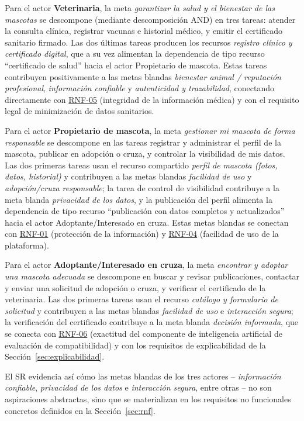 \documentclass[journal,onecolumn]{IEEEtran}
\begin{document}
	Para el actor \textbf{Veterinaria}, la meta \emph{garantizar la salud y el
		bienestar de las mascotas} se descompone (mediante descomposición AND) en tres
	tareas: atender la consulta clínica, registrar vacunas e historial médico, y
	emitir el certificado sanitario firmado. Las dos últimas tareas producen los
	recursos \emph{registro clínico y certificado digital}, que a su vez alimentan
	la dependencia de tipo recurso \enquote{certificado de salud} hacia el actor
	Propietario de mascota. Estas tareas contribuyen positivamente a las metas
	blandas \emph{bienestar animal / reputación profesional},
	\emph{información confiable} y \emph{autenticidad y trazabilidad}, conectando
	directamente con \hyperref[tab:RNF-05]{RNF-05} (integridad de la información médica) y con el
	requisito legal de minimización de datos sanitarios.
	
	Para el actor \textbf{Propietario de mascota}, la meta \emph{gestionar mi
		mascota de forma responsable} se descompone en las tareas registrar y
	administrar el perfil de la mascota, publicar en adopción o cruza, y
	controlar la visibilidad de mis datos. Las dos primeras tareas usan el
	recurso compartido \emph{perfil de mascota (fotos, datos, historial)} y
	contribuyen a las metas blandas \emph{facilidad de uso} y
	\emph{adopción/cruza responsable}; la tarea de control de visibilidad
	contribuye a la meta blanda \emph{privacidad de los datos}, y la publicación
	del perfil alimenta la dependencia de tipo recurso \enquote{publicación con
		datos completos y actualizados} hacia el actor Adoptante/Interesado en cruza.
	Estas metas blandas se conectan con \hyperref[tab:RNF-01]{RNF-01} (protección de la información) y
	\hyperref[tab:RNF-04]{RNF-04} (facilidad de uso de la plataforma).
	
	Para el actor \textbf{Adoptante/Interesado en cruza}, la meta \emph{encontrar
		y adoptar una mascota adecuada} se descompone en buscar y revisar
	publicaciones, contactar y enviar una solicitud de adopción o cruza, y
	verificar el certificado de la veterinaria. Las dos primeras tareas usan el
	recurso \emph{catálogo y formulario de solicitud} y contribuyen a las metas
	blandas \emph{facilidad de uso} e \emph{interacción segura}; la verificación
	del certificado contribuye a la meta blanda \emph{decisión informada}, que se
	conecta con \hyperref[tab:RNF-06]{RNF-06} (exactitud del componente de inteligencia artificial de
	evaluación de compatibilidad) y con los requisitos de explicabilidad de la
	Sección~\ref{sec:explicabilidad}.
	
	El SR evidencia así cómo las metas blandas de los tres actores --
	\emph{información confiable}, \emph{privacidad de los datos} e
	\emph{interacción segura}, entre otras -- no son aspiraciones abstractas, sino
	que se materializan en los requisitos no funcionales concretos definidos en la
	Sección~\ref{sec:rnf}.
	
\end{document}
